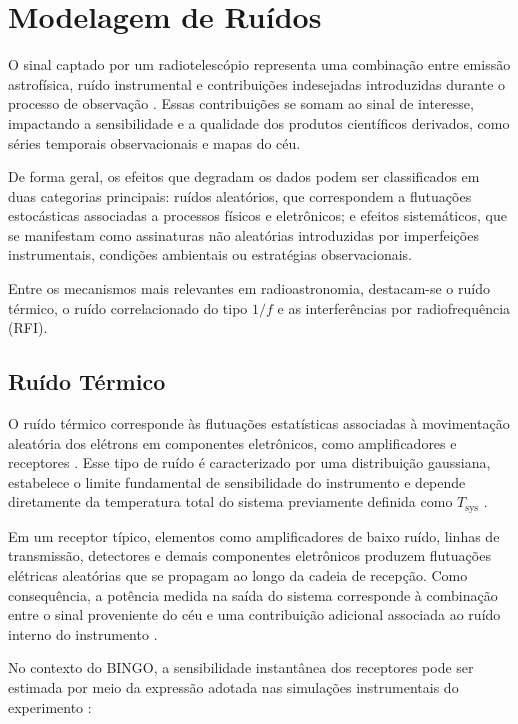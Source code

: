 \section{Modelagem de Ruídos}
O sinal captado por um radiotelescópio representa uma combinação entre emissão astrofísica, ruído instrumental e contribuições indesejadas introduzidas durante o processo de observação \cite{mericia2019hi}. Essas contribuições se somam ao sinal de interesse, impactando a sensibilidade e a qualidade dos produtos científicos derivados, como séries temporais observacionais e mapas do céu.

De forma geral, os efeitos que degradam os dados podem ser classificados em duas categorias principais: ruídos aleatórios, que correspondem a flutuações estocásticas associadas a processos físicos e eletrônicos; e efeitos sistemáticos, que se manifestam como assinaturas não aleatórias introduzidas por imperfeições instrumentais, condições ambientais ou estratégias observacionais.

Entre os mecanismos mais relevantes em radioastronomia, destacam-se o ruído térmico, o ruído correlacionado do tipo \(1/f\) e as interferências por radiofrequência (RFI).

\subsection{Ruído Térmico}
O ruído térmico corresponde às flutuações estatísticas associadas à movimentação aleatória dos elétrons em componentes eletrônicos, como amplificadores e receptores \cite{mericia2019hi}. Esse tipo de ruído é caracterizado por uma distribuição gaussiana, estabelece o limite fundamental de sensibilidade do instrumento e depende diretamente da temperatura total do sistema previamente definida como \(T_{\mathrm{sys}}\) \cite{wilson2013tools,burke2019introduction}.

Em um receptor típico, elementos como amplificadores de baixo ruído, linhas de transmissão, detectores e demais componentes eletrônicos produzem flutuações elétricas aleatórias que se propagam ao longo da cadeia de recepção. Como consequência, a potência medida na saída do sistema corresponde à combinação entre o sinal proveniente do céu e uma contribuição adicional associada ao ruído interno do instrumento \cite{marr_snell_kurtz_2015}.

No contexto do BINGO, a sensibilidade instantânea dos receptores pode ser estimada por meio da expressão adotada nas simulações instrumentais do experimento \cite{abdalla2022bingoI}:


